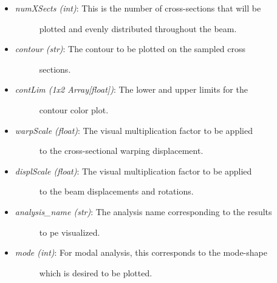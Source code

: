 \documentclass[letterpaper,10pt,english]{sphinxmanual}
\begin{document}
\begin{fulllineitems}
\begin{fulllineitems}
\begin{itemize}
\begin{description}
\end{description}

\item {} \begin{description}
\item[{\emph{numXSects (int)}: This is the number of cross-sections that will be}] \leavevmode
plotted and evenly distributed throughout the beam.

\end{description}

\item {} \begin{description}
\item[{\emph{contour (str)}: The contour to be plotted on the sampled cross}] \leavevmode
sections.

\end{description}

\item {} \begin{description}
\item[{\emph{contLim (1x2 Array{[}float{]})}: The lower and upper limits for the}] \leavevmode
contour color plot.

\end{description}

\item {} \begin{description}
\item[{\emph{warpScale (float)}: The visual multiplication factor to be applied}] \leavevmode
to the cross-sectional warping displacement.

\end{description}

\item {} \begin{description}
\item[{\emph{displScale (float)}: The visual multiplication factor to be applied}] \leavevmode
to the beam displacements and rotations.

\end{description}

\item {} \begin{description}
\item[{\emph{analysis\_name (str)}: The analysis name corresponding to the results}] \leavevmode
to pe visualized.

\end{description}

\item {} \begin{description}
\item[{\emph{mode (int)}: For modal analysis, this corresponds to the mode-shape}] \leavevmode
which is desired to be plotted.


\end{description}
\end{itemize}
\end{fulllineitems}
\end{fulllineitems}
\end{document}
